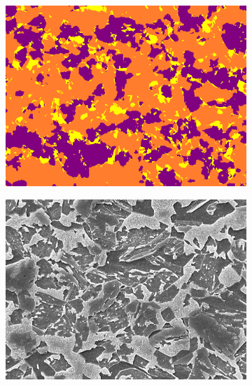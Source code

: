 \documentclass[]{article}
\begin{document}
\begin{figure}[!h]
\begin{subfigure}[b]{0.3\textwidth}
		\includegraphics[width=\textwidth]{images/inference/A-type-P.png}
		\caption{}
		\label{fig:A-type-pred}
	\end{subfigure}
	\begin{subfigure}[b]{0.3\textwidth}
		\centering
		\includegraphics[width=\textwidth]{images/inference/H2-type-O.jpg}
		\caption{}
		\label{fig:H2-type-orig}
	\end{subfigure}
	\hfill
	\begin{subfigure}[b]{0.3\textwidth}
		\centering

\end{subfigure}
\end{figure}
\end{document}
